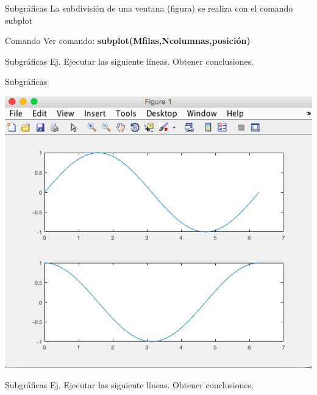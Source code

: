 \documentclass{bredelebeamer}
\begin{document}
\begin{frame}{Subgráficas}
La subdivisión de una ventana (figura) se realiza con el comando subplot
\begin{exampleblock}{Comando}
Ver comando: \textbf{subplot(Mfilas,Ncolumnas,posición)}
\end{exampleblock}
\end{frame}

\begin{frame}{Subgráficas}
Ej. Ejecutar las siguiente líneas. Obtener conclusiones.

\end{frame}

\begin{frame}{Subgráficas}
\begin{center}
\includegraphics[scale=0.35]{images/pantalla20.png}
\end{center}
\end{frame}

\begin{frame}{Subgráficas}
Ej. Ejecutar las siguiente líneas. Obtener conclusiones.

\end{frame}
\end{document}
